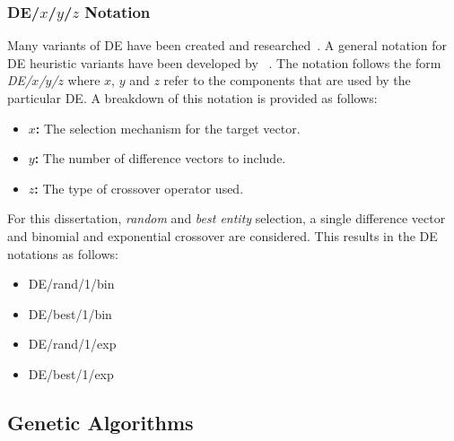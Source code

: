 \subsubsection{DE/$x$/$y$/$z$ Notation}

Many variants of \acs{DE} have been created and researched~\cite{ref:mezura:2006}. A general notation for \acs{DE} heuristic variants have been developed by \citeauthor{ref:storn:1996}~\cite{ref:storn:1996, ref:storn:1997}. The notation follows the form \textit{DE/$x$/$y$/$z$} where $x$, $y$ and $z$ refer to the components that are used by the particular \acs{DE}. A breakdown of this notation is provided as follows:

\begin{itemize}
	\item \textbf{$x$:} The selection mechanism for the target vector.
	\item \textbf{$y$:} The number of difference vectors to include.
	\item \textbf{$z$:} The type of crossover operator used.
\end{itemize}

For this dissertation, \textit{random} and \textit{best entity} selection, a single difference vector and binomial and exponential crossover are considered. This results in the \acs{DE} notations as follows:

\begin{itemize}
	\item DE/rand/1/bin
	\item DE/best/1/bin
	\item DE/rand/1/exp
	\item DE/best/1/exp
\end{itemize}

\subsection{Genetic Algorithms}\label{sec:heuristics:mh:ga}

